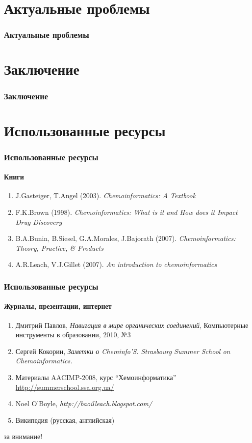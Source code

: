 \section{Актуальные проблемы}
\begin{frame}
  \frametitle{Актуальные проблемы}
\end{frame}

\section{Заключение}
\begin{frame}
  \frametitle{Заключение}
\end{frame}

\section{Использованные ресурсы}

\begin{frame}
  \frametitle{Использованные ресурсы}
  \framesubtitle{Книги}
  \begin{enumerate}
    \item J.Gasteiger, T.Angel (2003). \emph{Chemoinformatics: A Textbook}     
    \item F.K.Brown (1998). \emph{Chemoinformatics: What is it and How does it Impact Drug Discovery}
    \item B.A.Bunin, B.Siesel, G.A.Morales, J.Bajorath (2007). \emph{Chemoinformatics: Theory, Practice, \& Products}
    \item A.R.Leach, V.J.Gillet (2007). \emph{An introduction to chemoinformatics}
  \end{enumerate}
\end{frame}

\begin{frame}
  \frametitle{Использованные ресурсы}
  \framesubtitle{Журналы, презентации, интернет}
  \begin{enumerate}
    \item Дмитрий Павлов, \emph{Навигация в мире органических соединений}, Компьютерные инструменты в образовании, 2010, №3 
    \item Сергей Кокорин, \emph{Заметки о Cheminfo'S. Strasbourg Summer School on Chemoinformatics.} 
    \item Материалы AACIMP-2008, курс ``Хемоинформатика'' \\ 
	       \url{http://summerschool.ssa.org.ua/}
    \item Noel O'Boyle, \emph{http://baoilleach.blogspot.com/}
    \item Википедия (русская, английская)
   \end{enumerate}

\end{frame}

\begin{frame}
   \begin{center}
    за внимание!
   \end{center}
\end{frame}





